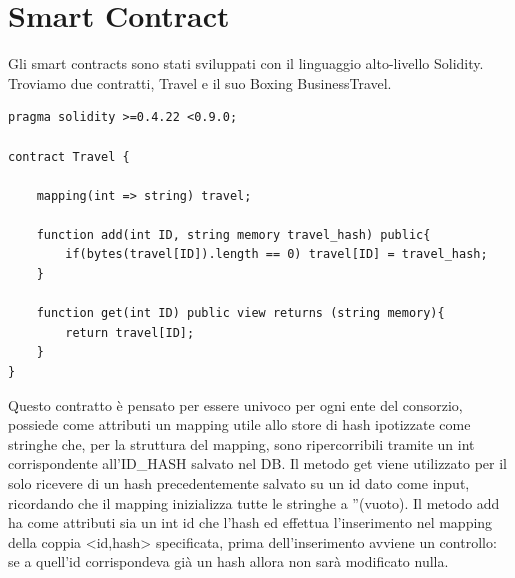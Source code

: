 \documentclass[11pt,a4paper,titlepage, twoside, openright]{report}
\begin{document}
\section{Smart Contract}
Gli smart contracts sono stati sviluppati con il linguaggio alto-livello Solidity. Troviamo due contratti, Travel e il suo Boxing BusinessTravel.
\begin{lstlisting}[language=Solidity]
pragma solidity >=0.4.22 <0.9.0;

contract Travel {

    mapping(int => string) travel;

    function add(int ID, string memory travel_hash) public{
        if(bytes(travel[ID]).length == 0) travel[ID] = travel_hash;
    }

    function get(int ID) public view returns (string memory){
        return travel[ID];
    }
}
\end{lstlisting}
Questo contratto è pensato per essere univoco per ogni ente del consorzio, possiede come attributi un mapping utile allo store di hash ipotizzate come stringhe che, per la struttura del mapping, sono ripercorribili tramite un int corrispondente all'ID\_HASH salvato nel DB. Il metodo get viene utilizzato per il solo ricevere di un hash precedentemente salvato su un id dato come input, ricordando che il mapping inizializza tutte le stringhe a ''(vuoto). Il metodo add ha come attributi sia un int id che l'hash ed effettua l'inserimento nel mapping della coppia <id,hash> specificata, prima dell'inserimento avviene un controllo: se a quell'id corrispondeva già un hash allora non sarà modificato nulla.
\end{document}
